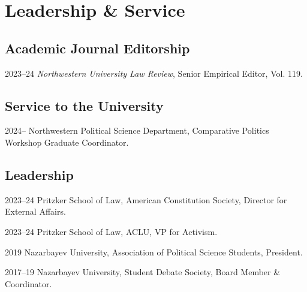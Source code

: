 \documentclass[11pt,letterpaper]{report}
\begin{document}
    \section*{Leadership \& Service}



    \subsection*{Academic Journal Editorship}

    \begin{tablist}

        \item[2023--24]  \tab{}\textit{Northwestern University Law Review}, Senior Empirical Editor, Vol. 119. 


    \end{tablist}

   

    \subsection*{Service to the University}

    \begin{tablist}
        \item[2024--]   \tab{}Northwestern Political Science Department, Comparative Politics Workshop Graduate Coordinator.
        
    \end{tablist}


    \subsection*{Leadership}

    \begin{tablist}
        \item[2023--24] \tab{}Pritzker School of Law, American Constitution Society, Director for External Affairs.
        \item[2023--24] \tab{}Pritzker School of Law, ACLU, VP for Activism.
        \item[2019] \tab{} Nazarbayev University, Association of Political Science Students, President.
        \item[2017--19] \tab{} Nazarbayev University, Student Debate Society, Board Member \& Coordinator.
    \end{tablist}


   
\end{document}
